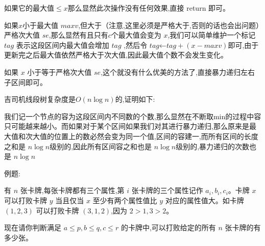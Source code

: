 \documentclass[a4paper]{ctexart}
\begin{document}
如果它的最大值$\le x$那么显然此次操作没有任何效果,直接 return 即可。

如果$x$小于最大值 $maxv$,但大于（注意,这里必须是严格大于,否则的话也会出问题）严格次大值 
$se$,那么显然有且只有$c$个最大值会变为 
$x$,我们可以简单维护一个标记 $tag$ 表示这段区间内最大值会增加 $tag$
,然后令 $tag$←$tag+(x-maxv)$即可,由于更新完之后最大值依然严格大于次大值,因此最大值个数不会发生变化。

如果 $x$ 小于等于严格次大值 $se$,这个就没有什么优美的方法了,直接暴力递归左右子区间即可。

吉司机线段树复杂度是$O(n\log n)$的,证明如下:

我们记一个节点的容为这段区间内不同数的个数,那么显然在不断取min的过程中容只可能越来越小。而如果对于某个区间如果我们对其进行暴力递归,那么原来是最大值和次大值的位置上的数必然会变为同一个值,区间的容建一,而所有区间的长度之和是 
$n\log n$级别的,因此所有区间容之和也是 $n\log n$级别的,暴力递归的次数也是 $n\log n$


例题:

有 $n$ 张卡牌,每张卡牌都有三个属性,第 $i$ 张卡牌的三个属性记作 $a_i,b_i,c_i$。卡牌 $x$ 可以打败卡牌 $y$ 当且仅当 $x$ 至少有两个属性值比 $y$ 对应的属性值大。如卡牌 $(1,2,3)$ 可以打败卡牌 $(3,1,2)$,因为 $2>1,3>2$。

现在请你判断满足 $a\leq p,b\leq q, c\leq r$ 的卡牌中,可以打败给定的所有 $n$ 张卡牌的有多少张。
\end{document}
